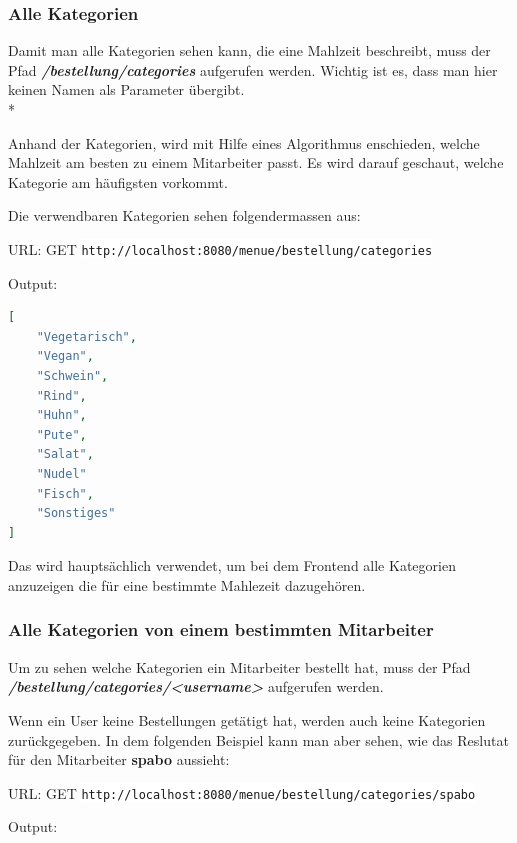 \pagebreak

\subsubsection{Alle Kategorien}

Damit man alle Kategorien sehen kann, die eine Mahlzeit beschreibt, muss der Pfad  \textbf{\textit{/bestellung/categories}} aufgerufen werden.
Wichtig ist es, dass man hier keinen Namen als Parameter übergibt. \\*

Anhand der Kategorien, wird mit Hilfe eines Algorithmus enschieden, welche Mahlzeit am besten zu einem Mitarbeiter passt. Es wird darauf geschaut, welche Kategorie
am häufigsten vorkommt.

Die verwendbaren Kategorien sehen folgendermassen aus:

URL: GET \colorbox{white}{\lstinline[basicstyle=\ttfamily\color{black},language=html]|http://localhost:8080/menue/bestellung/categories|}

Output:

\begin{lstlisting}[language=json,firstnumber=1]
[
    "Vegetarisch",
    "Vegan",
    "Schwein",
    "Rind",
    "Huhn",
    "Pute",
    "Salat",
    "Nudel"
    "Fisch",
    "Sonstiges"
]
\end{lstlisting}

Das wird hauptsächlich verwendet, um bei dem Frontend alle Kategorien anzuzeigen die für eine bestimmte Mahlezeit dazugehören.

\pagebreak

\subsubsection{Alle Kategorien von einem bestimmten Mitarbeiter}

Um zu sehen welche Kategorien ein Mitarbeiter bestellt hat, muss der Pfad \textbf{\textit{/bestellung/categories/<username>}} aufgerufen werden.

Wenn ein User keine Bestellungen getätigt hat, werden auch keine Kategorien zurückgegeben. In dem folgenden Beispiel kann man aber sehen, wie das Reslutat
für den Mitarbeiter \textbf{spabo} aussieht:

URL: GET \colorbox{white}{\lstinline[basicstyle=\ttfamily\color{black},language=html]|http://localhost:8080/menue/bestellung/categories/spabo|}

Output:

